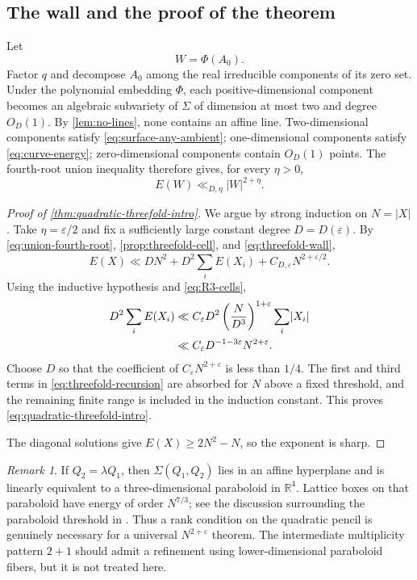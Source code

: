 \documentclass[11pt]{amsart}
\numberwithin{equation}{section}
\theoremstyle{definition}
\theoremstyle{remark}
\newtheorem{remark}[theorem]{Remark}
\newcommand{\R}{\mathbb R}
\newcommand{\eps}{\varepsilon}
\newcommand{\1}{\mathbf 1}
\newcommand{\card}[1]{\lvert #1\rvert}
\begin{document}
\subsection{The wall and the proof of the theorem}
Let
\[
 W=\Phi(A_0).
\]
Factor $q$ and decompose $A_0$ among the real irreducible components of its zero set.  Under the polynomial embedding $\Phi$, each positive-dimensional component becomes an algebraic subvariety of $\Sigma$ of dimension at most two and degree $O_D(1)$.  By \cref{lem:no-lines}, none contains an affine line.  Two-dimensional components satisfy \eqref{eq:surface-any-ambient}; one-dimensional components satisfy \eqref{eq:curve-energy}; zero-dimensional components contain $O_D(1)$ points.  The fourth-root union inequality therefore gives, for every $\eta>0$,
\begin{equation}\label{eq:threefold-wall}
 E(W)\ll_{D,\eta}\card W^{2+\eta}.
\end{equation}

\begin{proof}[Proof of \cref{thm:quadratic-threefold-intro}]
We argue by strong induction on $N=\card X$.  Take $\eta=\eps/2$ and fix a sufficiently large constant degree $D=D(\eps)$.  By \eqref{eq:union-fourth-root}, \cref{prop:threefold-cell}, and \eqref{eq:threefold-wall},
\begin{equation}\label{eq:threefold-recursion}
 E(X)
 \ll D N^2+D^2\sum_iE(X_i)+C_{D,\eps}N^{2+\eps/2}.
\end{equation}
Using the inductive hypothesis and \eqref{eq:R3-cells},
\begin{align}
 D^2\sum_iE(X_i)
 &\ll C_\eps D^2
 \left(\frac{N}{D^3}\right)^{1+\eps}
 \sum_i\card{X_i}\notag\\
 &\ll C_\eps D^{-1-3\eps}N^{2+\eps}.
\end{align}
Choose $D$ so that the coefficient of $C_\eps N^{2+\eps}$ is less than $1/4$.  The first and third terms in \eqref{eq:threefold-recursion} are absorbed for $N$ above a fixed threshold, and the remaining finite range is included in the induction constant.  This proves \eqref{eq:quadratic-threefold-intro}.

The diagonal solutions give $E(X)\geq2N^2-N$, so the exponent is sharp.
\end{proof}

\begin{remark}\label{rem:repeated-spectrum}
If $Q_2=\lambda Q_1$, then $\Sigma(Q_1,Q_2)$ lies in an affine hyperplane and is linearly equivalent to a three-dimensional paraboloid in $\R^4$.  Lattice boxes on that paraboloid have energy of order $N^{7/3}$; see the discussion surrounding the paraboloid threshold in \cite{Mudgal}.  Thus a rank condition on the quadratic pencil is genuinely necessary for a universal $N^{2+\eps}$ theorem.  The intermediate multiplicity pattern $2+1$ should admit a refinement using lower-dimensional paraboloid fibers, but it is not treated here.
\end{remark}
\end{document}
